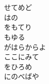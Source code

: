 \documentclass[10pt,b5j]{tarticle} %
\begin{document}
\begin{enumerate}
\begin{minipage}[c]{\blocksize}
        \vspace{\linespace}
        \item~\\
        \\
        せてめど\\
        はの\\
        をもてり\\
        もゆる\\
        がはらからよ\\
        ここにみて\\
        をひろめ\\
        にのべばや\\
    
    \end{minipage}
\end{enumerate} %
\end{document}
